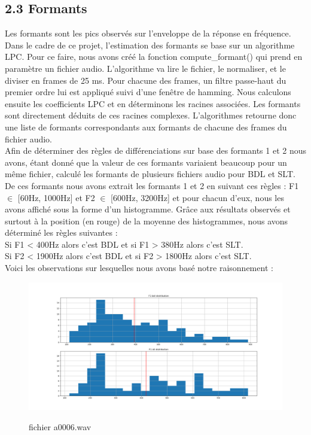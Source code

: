 \documentclass[a4paper,12pt]{report}	%
\begin{document}
{\subsection*{2.3 Formants}}
Les formants sont les pics observés sur l'enveloppe de la réponse en fréquence. Dans le cadre de ce projet, l'estimation des formants se base sur un algorithme LPC. Pour ce faire, nous avons créé la fonction compute\_formant() qui prend en paramètre un fichier audio. L'algorithme va lire le fichier, le normaliser, et le diviser en frames de 25 ms. Pour chacune des frames, un filtre passe-haut du premier ordre lui est appliqué suivi d'une fenêtre de hamming. Nous calculons ensuite les coefficients LPC et en déterminons les racines associées. Les formants sont directement déduits de ces racines complexes. L'algorithmes retourne donc une liste de formants correspondants aux formants de chacune des frames du fichier audio. \\
Afin de déterminer des règles de différenciations sur base des formants 1 et 2 nous avons, étant donné que la valeur de ces formants variaient beaucoup pour un même fichier, calculé les formants de plusieurs fichiers audio pour BDL et SLT. De ces formants nous avons extrait les formants 1 et 2 en suivant ces règles : F1 $\in$ [60Hz, 1000Hz] et F2 $\in$ [600Hz, 3200Hz] et pour chacun d'eux, nous les avons affiché sous la forme d'un histogramme. Grâce aux résultats observés et surtout à la position (en rouge) de la moyenne des histogrammes, nous avons déterminé les règles suivantes : \\
Si F1 < 400Hz alors c'est BDL et si F1 > 380Hz alors c'est SLT.\\
Si F2 < 1900Hz alors c'est BDL et si F2 > 1800Hz alors c'est SLT. \\
Voici les observations sur lesquelles nous avons basé notre raisonnement : \\
\begin{figure}[H]
	{\includegraphics[scale=0.35]{figures/F1_distr_a0006.png}}
	\caption{fichier a0006.wav} 
\end{figure}
\end{document}
